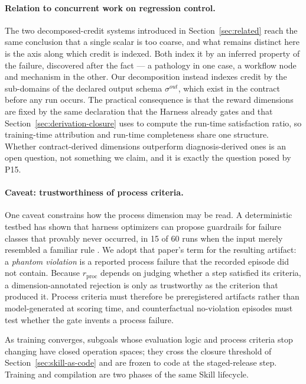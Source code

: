 \paragraph{Relation to concurrent work on regression control.}
The two decomposed-credit systems introduced in Section~\ref{sec:related} \cite{luo2026gsme,lin2026wml} reach the same conclusion that a single scalar is too coarse, and what remains distinct here is the axis along which credit is indexed. Both index it by an inferred property of the failure, discovered after the fact --- a pathology in one case, a workflow node and mechanism in the other. Our decomposition instead indexes credit by the sub-domains of the declared output schema $\sigma^{out}$, which exist in the contract before any run occurs. The practical consequence is that the reward dimensions are fixed by the same declaration that the Harness already gates and that Section~\ref{sec:derivation-closure} uses to compute the run-time satisfaction ratio, so training-time attribution and run-time completeness share one structure. Whether contract-derived dimensions outperform diagnosis-derived ones is an open question, not something we claim, and it is exactly the question posed by P15.

\paragraph{Caveat: trustworthiness of process criteria.}
One caveat constrains how the process dimension may be read. A deterministic testbed has shown that harness optimizers can propose guardrails for failure classes that provably never occurred, in 15 of 60 runs when the input merely resembled a familiar rule \cite{wang2026phantom}. We adopt that paper's term for the resulting artifact: a \textit{phantom violation} is a reported process failure that the recorded episode did not contain. Because $r_{\mathrm{proc}}$ depends on judging whether a step satisfied its criteria, a dimension-annotated rejection is only as trustworthy as the criterion that produced it. Process criteria must therefore be preregistered artifacts rather than model-generated at scoring time, and counterfactual no-violation episodes must test whether the gate invents a process failure.

As training converges, subgoals whose evaluation logic and process criteria stop changing have closed operation spaces; they cross the closure threshold of Section~\ref{sec:skill-as-code} and are frozen to code at the staged-release step. Training and compilation are two phases of the same Skill lifecycle.

